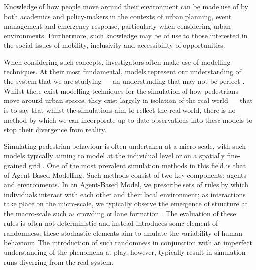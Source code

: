 \documentclass[12pt, twoside, a4paper]{article}
\begin{document}

Knowledge of how people move around their environment can be made use of by both
academics and policy-makers in the contexts of urban planning, event management
and emergency response, particularly when considering urban environments.
Furthermore, such knowledge may be of use to those interested in the social issues of
mobility, inclusivity and accessibility of opportunities.

When considering such concepts, investigators often make use of modelling
techniques.
At their most fundamental, models represent our understanding of the system that
we are studying --- an understanding that may not be perfect
\citep{stanislaw1986tests}.
Whilst there exist modelling techniques for the simulation of how pedestrians
move around urban spaces, they exist largely in isolation of the real-world --- that is
to say that whilst the simulations aim to reflect the real-world, there is no
method by which we can incorporate up-to-date observations into these models to
stop their divergence from reality.

Simulating pedestrian behaviour is often undertaken at a micro-scale, with such
models typically aiming to model at the individual level or on a spatially
fine-grained grid \citep{burstedde2001simulation}.
One of the most prevalent simulation methods in this field is that of
Agent-Based Modelling.
Such methods consist of two key components: agents and environments.
In an Agent-Based Model, we prescribe sets of rules by which individuals
interact with each other and their local environment; as interactions take
place on the micro-scale, we typically observe the emergence of structure at the
macro-scale such as crowding \citep{batty2003discrete} or lane formation
\citep{liu2014agent}.
The evaluation of these rules is often not deterministic and instead introduces
some element of randomness; these stochastic elements aim to emulate the
variability of human behaviour.
The introduction of such randomness in conjunction with an imperfect
understanding of the phenomena at play, however, typically result in simulation
runs diverging from the real system.
\end{document}
